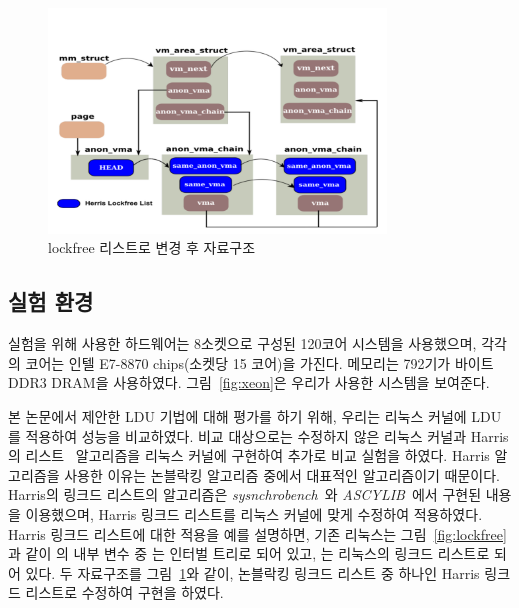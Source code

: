  \begin{figure}[h]
    \centering
    \includegraphics[width=0.8\textwidth]{fig/lockfree_2}
    \caption{lockfree 리스트로 변경 후 자료구조}
  \label{fig:lockfree_2}
\end{figure}

\subsection{실험 환경}

실험을 위해 사용한 하드웨어는 8소켓으로 구성된 120코어 시스템을 사용했으며,
각각의 코어는 인텔 E7-8870 chips(소켓당 15 코어)을 가진다.
메모리는 792기가 바이트 DDR3 DRAM을 사용하였다.
그림~\ref{fig:xeon}은 우리가 사용한 시스템을 보여준다.

본 논문에서 제안한 LDU 기법에 대해 평가를 하기 위해, 우리는 리눅스 커널에 LDU를 적용하여 성능을 비교하였다.
비교 대상으로는 수정하지 않은 리눅스 커널과 Harris의  리스트~\cite{Harris2001Lockfree}
알고리즘을 리눅스 커널에 구현하여 추가로 비교 실험을 하였다.
Harris 알고리즘을 사용한 이유는 논블락킹 알고리즘 중에서 대표적인 알고리즘이기 때문이다. 
Harris의 링크드 리스트의 알고리즘은
\textit{sysnchrobench}~\cite{Gramoli2015Synchrobench}와
\textit{ASCYLIB}~\cite{David2015ASYNCHRONIZED}에서 구현된 내용을 이용했으며, Harris 링크드 
리스트를 리눅스 커널에 맞게 수정하여 적용하였다.
Harris 링크드 리스트에 대한 적용을 예를 설명하면, 기존 리눅스는 그림~\ref{fig:lockfree}과 같이 
의 내부 변수 중 는 인터벌 트리로 되어 있고, 
는 리눅스의 링크드 리스트로 되어 있다. 
두 자료구조를 그림~\ref{fig:lockfree_2}와 같이, 
논블락킹 링크드 리스트 중 하나인 Harris 링크드 리스트로 수정하여 구현을 하였다.


